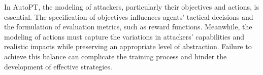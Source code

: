 In AutoPT, the modeling of attackers, particularly their objectives and actions, is essential. The specification of objectives influences agents' tactical decisions and the formulation of evaluation metrics, such as reward functions. Meanwhile, the modeling of actions must capture the variations in attackers' capabilities and realistic impacts while preserving an appropriate level of abstraction. Failure to achieve this balance can complicate the training process and hinder the development of effective strategies.








